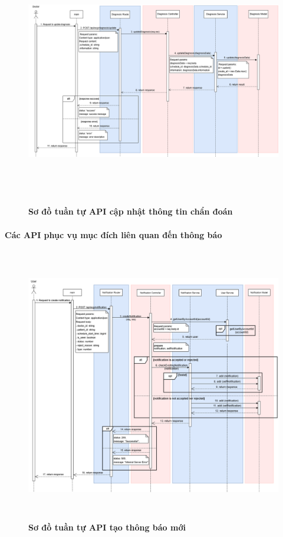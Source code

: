 \begin{figure}[H]
	\centering
	\includegraphics[width=15cm,height=11cm]{Images/api_sequence/diag/update.drawio.png}
	\caption[Sơ đồ tuần tự API cập nhật thông tin chẩn đoán]{\bfseries \fontsize{12pt}{0pt}\selectfont Sơ đồ tuần tự API cập nhật thông tin chẩn đoán}
	\label{sequence_diagram_update_diagnosis}
\end{figure}
\paragraph{Các API phục vụ mục đích liên quan đến thông báo}
\mbox{}
\begin{figure}[H]
	\centering
	\includegraphics[width=15cm,height=12cm]{Images/api_sequence/noti/createNotification.drawio.png}
	\caption[Sơ đồ tuần tự API tạo thông báo mới]{\bfseries \fontsize{12pt}{0pt}\selectfont Sơ đồ tuần tự API tạo thông báo mới}
	\label{sequence_diagram_create_notification}
\end{figure}


